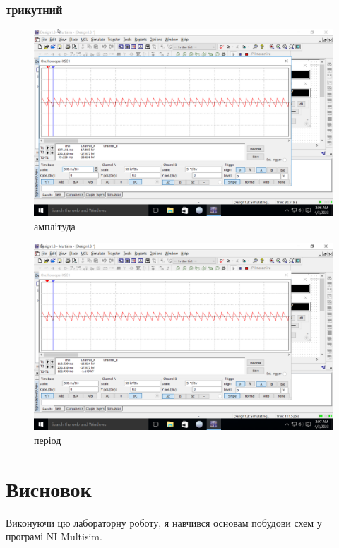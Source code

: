 \documentclass[a4paper, 12pt, oneside]{extarticle}
\begin{document}
\subsubsection*{трикутний}
\begin{figure}[h]
	\centering
	\includegraphics[width=.9\textwidth]{tri1}
	\caption{амплітуда}
\end{figure}
\begin{figure}[h]
	\centering
	\includegraphics[width=.9\textwidth]{tri2}
	\caption{період}
\end{figure}

\begin{table}[h]
%
\end{table}

\clearpage

\section*{Висновок}

Виконуючи цю лабораторну роботу, я навчився основам
побудови схем у програмі NI Multisim.
\end{document}
